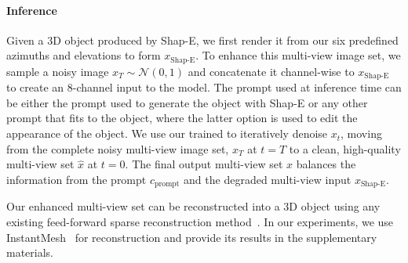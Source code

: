 \vspace{-10pt}
\paragraph{Inference}
Given a 3D object produced by Shap-E, we first render it from our six predefined azimuths and elevations to form \( x_{\text{Shap-E}} \). To enhance this multi-view image set, we sample a noisy image $x_T \sim \mathcal{N}(0, 1)$ and concatenate it channel-wise to \( x_{\text{Shap-E}} \) to create an 8-channel input to the model. 
The prompt used at inference time can be either the prompt used to generate the object with Shap-E or any other prompt that fits to the object, where the latter option is used to edit the appearance of the object.
We use our trained \ourname{} to iteratively denoise $x_t$, moving from the complete noisy multi-view image set, $x_T$ at $t=T$ to a clean, high-quality multi-view set $\hat{x}$ at $t=0$. The final output multi-view set $\hat{x}$ balances the information from the prompt $c_{\text{prompt}}$ and the degraded multi-view input $x_{\text{Shap-E}}$.

Our enhanced multi-view set can be reconstructed into a 3D object using any existing feed-forward sparse reconstruction method~\cite{xu2024instantmesh, jin2024lvsmlargeviewsynthesis, zhuang2024gtr, zhang2024geolrm}. 
In our experiments, we use InstantMesh~\cite{xu2024instantmesh} for reconstruction and provide its results in the supplementary materials.